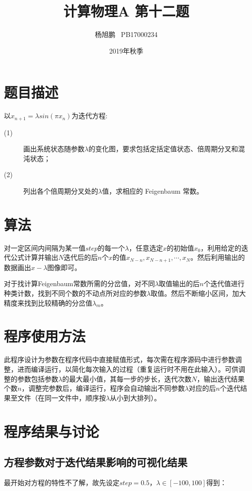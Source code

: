 \documentclass[a4paper,11pt]{article}
\author{ 杨旭鹏  \  PB17000234}
\date{2019年秋季}
\title{计算物理A 第十二题}
\begin{document}
\maketitle
\tableofcontents

\section{题目描述}
以$x_{n+1}=\lambda sin(\pi x_{n})$为迭代方程:

\begin{description}
\item[(1)] 画出系统状态随参数$\lambda$的变化图，要求包括定括定值状态、倍周期分叉和混沌状态；
\item[(2)]列出各个倍周期分叉处的$\lambda$值，求相应的 Feigenbaum 常数。
\end{description}


\section{算法}
对⼀定区间内间隔为某一值$step$的每⼀个$\lambda$，任意选定$x$的初始值$x_{0}$，利用给定的迭代公式计算并输出$N$迭代后的后$n$个$x$的值$x_{N-n},x_{N-n+1}, \cdots ,x_{N}$。然后利用输出的数据画出$x-\lambda$图像即可。

对于找计算Feigenbaum常数所需的分岔值，对不同$\lambda$取值输出的后$n$个迭代值进行种类计数，找到不同个数的不动点所对应的参数$\lambda$取值。然后不断缩小区间，加大精度来找到比较精确的分岔值$\lambda_{m}$。


\section{程序使用方法}
此程序设计为参数在程序代码中直接赋值形式，每次需在程序源码中进行参数调整，进而编译运行，以简化每次输入的过程（重复运行时不用在此输入）。可供调整的参数包括参数$\lambda$的最大最小值，其每一步的步长，迭代次数$N$，输出迭代结果个数$n$，调整完参数后，编译运行，程序会自动输出不同参数$\lambda$对应的后$n$个迭代结果至文件（在同一文件中，顺序按$\lambda$从小到大排列）。

\section{程序结果与讨论}

\subsection{方程参数对于迭代结果影响的可视化结果}
最开始对方程的特性不了解，故先设定$step = 0.5$，$\lambda \in [-100,100]$得到：
\end{document}

